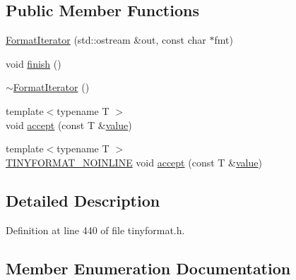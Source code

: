 \subsection*{Public Member Functions}
\begin{DoxyCompactItemize}
\item 
\hyperlink{classtinyformat_1_1detail_1_1_format_iterator_a798e0f475996df1b0a4f93540d96791b}{Format\+Iterator} (std\+::ostream \&out, const char $\ast$fmt)
\item 
void \hyperlink{classtinyformat_1_1detail_1_1_format_iterator_a46377a804f72dbad1e508d2fbaa18ce9}{finish} ()
\item 
\hyperlink{classtinyformat_1_1detail_1_1_format_iterator_a700ea30dbed93c28c499ac01c59a78a4}{$\sim$\+Format\+Iterator} ()
\item 
{\footnotesize template$<$typename T $>$ }\\void \hyperlink{classtinyformat_1_1detail_1_1_format_iterator_a2a2b99ea3a371e1ff8d56d8c8b801bdb}{accept} (const T \&\hyperlink{cache_8cc_a0f61d63b009d0880a89c843bd50d8d76}{value})
\item 
{\footnotesize template$<$typename T $>$ }\\\hyperlink{tinyformat_8h_a6aa2353acc671b972658fd73a813b960}{T\+I\+N\+Y\+F\+O\+R\+M\+A\+T\+\_\+\+N\+O\+I\+N\+L\+I\+N\+E} void \hyperlink{classtinyformat_1_1detail_1_1_format_iterator_a914be2066071c01cac4c2ea867c9d89a}{accept} (const T \&\hyperlink{cache_8cc_a0f61d63b009d0880a89c843bd50d8d76}{value})
\end{DoxyCompactItemize}


\subsection{Detailed Description}


Definition at line 440 of file tinyformat.\+h.



\subsection{Member Enumeration Documentation}
\hypertarget{classtinyformat_1_1detail_1_1_format_iterator_a219d15b3b08e2e2039043d2e992cc0b4}{}
